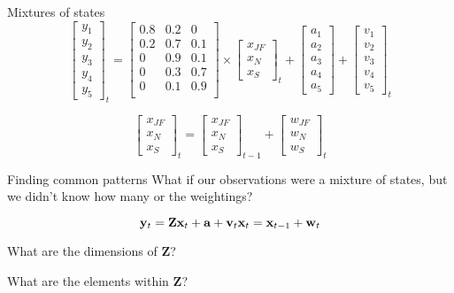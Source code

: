\documentclass[
  ignorenonframetext,
]{beamer}
\begin{document}
\begin{frame}{Mixtures of states}
\protect\hypertarget{mixtures-of-states}{}
\[
\begin{bmatrix}
 y_1 \\
 y_2 \\
 y_3 \\
 y_4 \\
 y_5 
\end{bmatrix}_t =
\begin{bmatrix}
 0.8 & 0.2 & 0 \\
 0.2 & 0.7 & 0.1 \\
 0 & 0.9 & 0.1 \\
 0 & 0.3 & 0.7 \\
 0 & 0.1 & 0.9 \\
\end{bmatrix} \times
\begin{bmatrix}
 x_{JF} \\
 x_N \\
 x_S 
\end{bmatrix}_t +
\begin{bmatrix}
 a_1 \\
 a_2 \\
 a_3 \\
 a_4 \\
 a_5 
\end{bmatrix} +
\begin{bmatrix}
 v_1 \\
 v_2 \\
 v_3 \\
 v_4 \\
 v_5 
\end{bmatrix}_t
\]

\[
\begin{bmatrix}
 x_{JF} \\
 x_N \\
 x_S 
\end{bmatrix}_t =
\begin{bmatrix}
 x_{JF} \\
 x_N \\
 x_S 
\end{bmatrix}_{t-1} +
\begin{bmatrix}
 w_{JF} \\
 w_N \\
 w_S
\end{bmatrix}_t
\]
\end{frame}

\begin{frame}{Finding common patterns}
\protect\hypertarget{finding-common-patterns-1}{}
What if our observations were a mixture of states, but we didn't know
how many or the weightings?

\[
\mathbf{y}_t = \mathbf{Z} \mathbf{x}_t + \mathbf{a} + \mathbf{v}_t \\
\mathbf{x}_t = \mathbf{x}_{t-1} + \mathbf{w}_t
\]

What are the dimensions of \(\mathbf{Z}\)?

What are the elements within \(\mathbf{Z}\)?
\end{frame}
\end{document}
